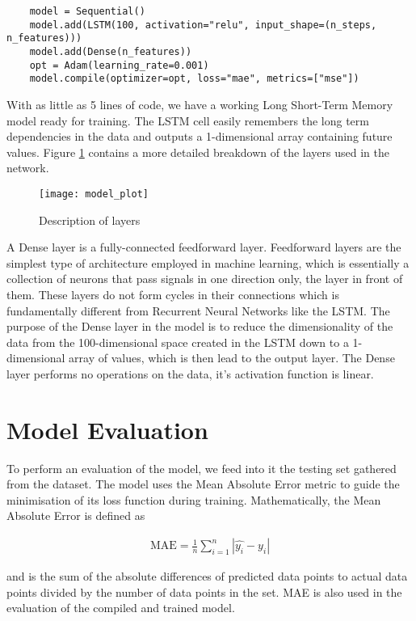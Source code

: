 \begin{verbatim}
    model = Sequential()
    model.add(LSTM(100, activation="relu", input_shape=(n_steps, n_features)))
    model.add(Dense(n_features))
    opt = Adam(learning_rate=0.001)
    model.compile(optimizer=opt, loss="mae", metrics=["mse"])
\end{verbatim}

With as little as 5 lines of code, we have a working Long Short-Term Memory model ready for training. The LSTM cell easily remembers the long term dependencies in the data and outputs a 1-dimensional array containing future values. Figure \ref{tab:layer_description} contains a more detailed breakdown of the layers used in the network.

\begin{figure}[H]
    \centering
    \texttt{[image: model\_plot]}
    \caption{Description of layers}
    \label{tab:layer_description}
\end{figure}

A Dense layer is a fully-connected feedforward layer. Feedforward layers are the simplest type of architecture employed in machine learning, which is essentially a collection of neurons that pass signals in one direction only, the layer in front of them. These layers do not form cycles in their connections which is fundamentally different from Recurrent Neural Networks like the LSTM. The purpose of the Dense layer in the model is to reduce the dimensionality of the data from the 100-dimensional space created in the LSTM down to a 1-dimensional array of values, which is then lead to the output layer. The Dense layer performs no operations on the data, it's activation function is linear.

\section{Model Evaluation}
To perform an evaluation of the model, we feed into it the testing set gathered from the dataset. The model uses the Mean Absolute Error metric to guide the minimisation of its loss function during training. Mathematically, the Mean Absolute Error is defined as

\begin{align}
    \text{MAE} = \frac{1}{n} \sum\limits_{i=1}^{n} {|\hat{y_i} - y_i|}
\end{align}

and is the sum of the absolute differences of predicted data points to actual data points divided by the number of data points in the set. MAE is also used in the evaluation of the compiled and trained model.

